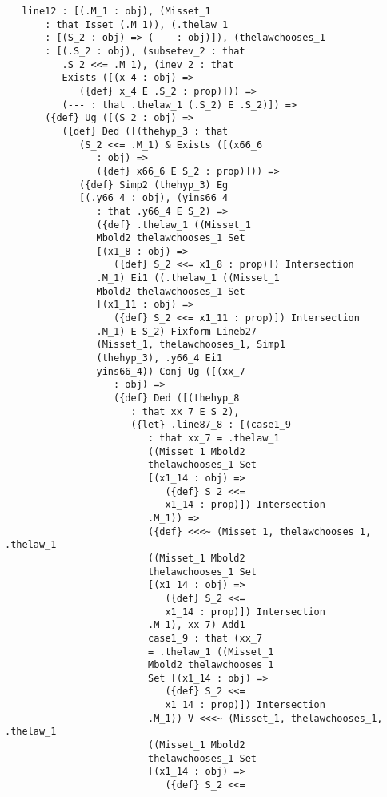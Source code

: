 \documentclass{article}
\begin{document}
\begin{verbatim}
   line12 : [(.M_1 : obj), (Misset_1 
       : that Isset (.M_1)), (.thelaw_1 
       : [(S_2 : obj) => (--- : obj)]), (thelawchooses_1 
       : [(.S_2 : obj), (subsetev_2 : that 
          .S_2 <<= .M_1), (inev_2 : that 
          Exists ([(x_4 : obj) => 
             ({def} x_4 E .S_2 : prop)])) => 
          (--- : that .thelaw_1 (.S_2) E .S_2)]) => 
       ({def} Ug ([(S_2 : obj) => 
          ({def} Ded ([(thehyp_3 : that 
             (S_2 <<= .M_1) & Exists ([(x66_6 
                : obj) => 
                ({def} x66_6 E S_2 : prop)])) => 
             ({def} Simp2 (thehyp_3) Eg 
             [(.y66_4 : obj), (yins66_4 
                : that .y66_4 E S_2) => 
                ({def} .thelaw_1 ((Misset_1 
                Mbold2 thelawchooses_1 Set 
                [(x1_8 : obj) => 
                   ({def} S_2 <<= x1_8 : prop)]) Intersection 
                .M_1) Ei1 ((.thelaw_1 ((Misset_1 
                Mbold2 thelawchooses_1 Set 
                [(x1_11 : obj) => 
                   ({def} S_2 <<= x1_11 : prop)]) Intersection 
                .M_1) E S_2) Fixform Lineb27 
                (Misset_1, thelawchooses_1, Simp1 
                (thehyp_3), .y66_4 Ei1 
                yins66_4)) Conj Ug ([(xx_7 
                   : obj) => 
                   ({def} Ded ([(thehyp_8 
                      : that xx_7 E S_2), 
                      ({let} .line87_8 : [(case1_9 
                         : that xx_7 = .thelaw_1 
                         ((Misset_1 Mbold2 
                         thelawchooses_1 Set 
                         [(x1_14 : obj) => 
                            ({def} S_2 <<= 
                            x1_14 : prop)]) Intersection 
                         .M_1)) => 
                         ({def} <<<~ (Misset_1, thelawchooses_1, .thelaw_1 
                         ((Misset_1 Mbold2 
                         thelawchooses_1 Set 
                         [(x1_14 : obj) => 
                            ({def} S_2 <<= 
                            x1_14 : prop)]) Intersection 
                         .M_1), xx_7) Add1 
                         case1_9 : that (xx_7 
                         = .thelaw_1 ((Misset_1 
                         Mbold2 thelawchooses_1 
                         Set [(x1_14 : obj) => 
                            ({def} S_2 <<= 
                            x1_14 : prop)]) Intersection 
                         .M_1)) V <<<~ (Misset_1, thelawchooses_1, .thelaw_1 
                         ((Misset_1 Mbold2 
                         thelawchooses_1 Set 
                         [(x1_14 : obj) => 
                            ({def} S_2 <<= 

\end{verbatim}
\end{document}
